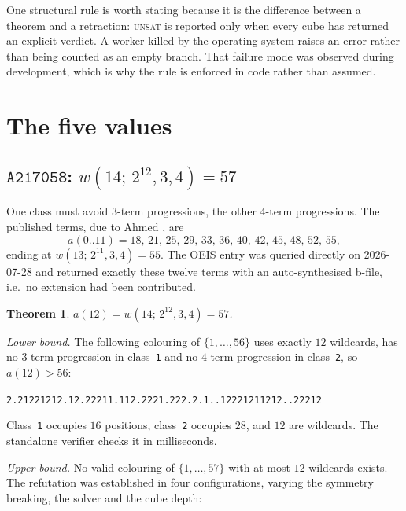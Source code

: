 \documentclass[12pt]{article}
\newtheorem{theorem}{Theorem}
\theoremstyle{remark}
\newcommand{\seq}[1]{\texttt{#1}}
\begin{document}
One structural rule is worth stating because it is the difference between a
theorem and a retraction: \textsc{unsat} is reported only when every cube has
returned an explicit verdict. A worker killed by the operating system raises
an error rather than being counted as an empty branch. That failure mode was observed
during development, which is why the rule is enforced in code rather than
assumed.

\section{The five values}\label{sec:results}

\subsection{$\seq{A217058}$: $w(14;\,2^{12},3,4)=57$}\label{sec:a217058}

One class must avoid $3$-term progressions, the other $4$-term progressions.
The published terms, due to Ahmed \cite{ahmed2009,ahmed2013}, are
\[
a(0..11) = 18,\,21,\,25,\,29,\,33,\,36,\,40,\,42,\,45,\,48,\,52,\,55 ,
\]
ending at $w(13;\,2^{11},3,4)=55$. The OEIS entry was queried directly on
2026-07-28 and returned exactly these twelve terms with an auto-synthesised
b-file, i.e.\ no extension had been contributed.

\begin{theorem}\label{thm:a217058}
$a(12) = w(14;\,2^{12},3,4) = 57$.
\end{theorem}

\emph{Lower bound.} The following colouring of $\{1,\dots,56\}$ uses exactly
$12$ wildcards, has no $3$-term progression in class~\texttt{1} and no
$4$-term progression in class~\texttt{2}, so $a(12) > 56$:

\begin{center}\small
\texttt{2.21221212.12.22211.112.2221.222.2.1..12221211212..22212}
\end{center}

\noindent Class~\texttt{1} occupies $16$ positions, class~\texttt{2} occupies
$28$, and $12$ are wildcards. The standalone verifier checks it in
milliseconds.

\emph{Upper bound.} No valid colouring of $\{1,\dots,57\}$ with at most $12$
wildcards exists. The refutation was established in four configurations,
varying the symmetry breaking, the solver and the cube depth:
\end{document}
